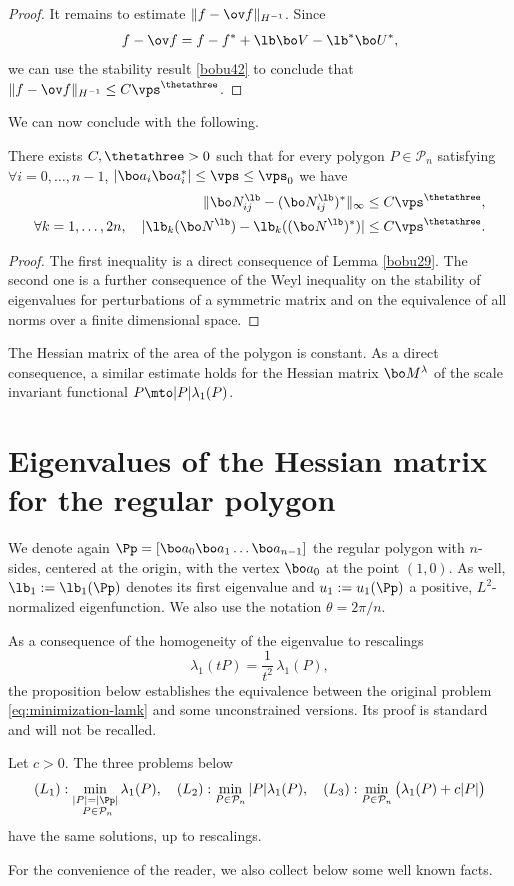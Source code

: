\begin{proof}
It remains to estimate $ \| f -\ov f\| _{H^{-1}}$. Since
\[
f-\ov f= f-f^* + \lb \bo V-\lb^* \bo U^*,
\]
we can use the stability result \eqref{bobu42} to conclude that
$\| f -\ov f\| _{H^{-1}} \le C \vps^\thetathree$.
\end{proof}

We can now conclude with the following.
\begin{thm}\label{bobu43}
There exists $C, \thetathree >0$ such that for every polygon $P \in {\mathcal P}_n$ satisfying $\forall i=0, \dots, n-1$, $|\bo a_i\bo a_i^*| \le \vps \le \vps _0$ we have
\begin{align*}
\|\bo N^\lb _{ij} -(\bo N^\lb _{ij})^*\|_\infty &\le C \vps^\thetathree,
\\
\forall k=1, \dots, 2n, \quad |\lb_k(\bo N^\lb)- \lb_k((\bo N^{\lb})^*)|&\le C \vps^\thetathree.
\end{align*}
\end{thm}
\begin{proof}
The first inequality is a direct consequence of Lemma \ref{bobu29}. The second one is a further consequence of the Weyl inequality on the stability of eigenvalues for perturbations of a symmetric matrix and on the equivalence of all norms over a finite dimensional space.
\end{proof}

\begin{rem}
The Hessian matrix of the area of the polygon is constant. As a direct consequence, a similar estimate holds for the Hessian matrix $\bo M^\lambda$ of the scale invariant functional $P\mto |P|\lambda_1(P)$.
\end{rem}

\section{Eigenvalues of the Hessian matrix for the regular polygon}
\label{sec:eig-hessian}

We denote again $\Pp =[\bo a_0 \bo a_1 \dots\bo a_{n-1}]$ the regular polygon with $n$-sides, centered at the origin, with the vertex $\bo a_0$ at the point $(1,0)$. As well, $\lb_1:= \lb_1(\Pp)$ denotes its first eigenvalue and $u_1:=u_1(\Pp)$ a positive, $L^2$-normalized eigenfunction. We also use the notation $\theta = 2\pi/n$.

As a consequence of the homogeneity of the eigenvalue to rescalings
\[
\lambda_1(tP) = \frac{1}{t^2}\, \lambda_1(P),
\]
the proposition below establishes the equivalence between the original problem \eqref{eq:minimization-lamk} and some unconstrained versions. Its proof is standard and will not be recalled.
\begin{propo}
Let $c>0$. The three problems below
\begin{equation}\label{eq:constr}
(L_1): \min_{\substack{|P|=|\Pp|\\\ P \in \mathcal P_n}} \lambda_1(P), \quad (L_2): \min_{P \in \mathcal P_n} |P| \lambda_1(P), \quad (L_3):\min_{P\in \mathcal P_n} \big (\lambda_1(P) +c |P|\big)
\end{equation}
have the same solutions, up to rescalings.
\end{propo}
For the convenience of the reader,
we also collect below some well known facts.

